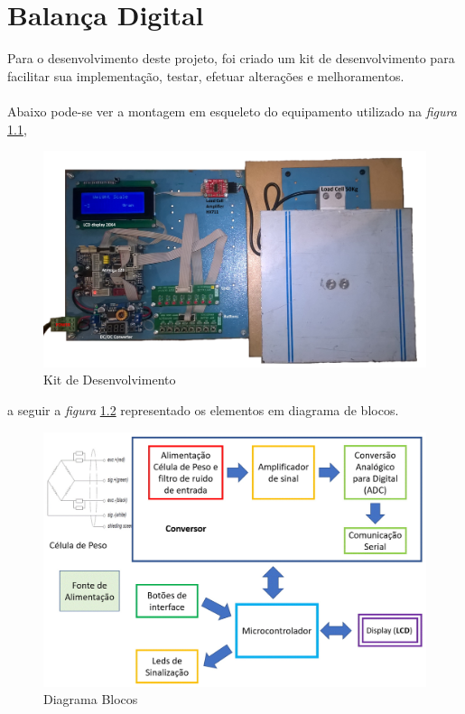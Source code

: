 \chapter{Balança Digital}
Para o desenvolvimento deste projeto, foi criado um kit de desenvolvimento para facilitar sua implementação, testar, efetuar alterações e melhoramentos.
\\
\\
Abaixo pode-se ver a montagem em esqueleto do equipamento utilizado na \textit{figura} \ref{Kit_Desenvolvimento_2},
\begin{figure}[H]
	\centering
	\includegraphics[scale=0.12]{./image/PESTA/kit/Kit_Desenvolvimento_2.jpg}
	\caption{Kit de Desenvolvimento}
	\label{Kit_Desenvolvimento_2}
\end{figure}
a seguir a \textit{figura} \ref{Block_diagram_1} representado os elementos em diagrama de blocos.
\begin{figure}[H]
	\centering
	\includegraphics[scale=0.27]{./image/PESTA/Diagrama/Diagrama_bloco_3.jpg}
	\caption{Diagrama Blocos}
	\label{Block_diagram_1}
\end{figure}
